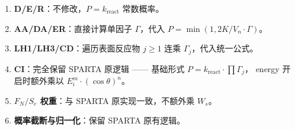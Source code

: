 \documentclass[12pt,a4paper]{article}
\begin{document}
\begin{enumerate}
  \item \textbf{D/E/R}：不修改，$P = k_{\text{react}}$ 常数概率。
  \item \textbf{AA/DA/ER}：直接计算单因子 $\Gamma$，代入 $P = \min(1, 2K/V_n \cdot \Gamma)$。
  \item \textbf{LH1/LH3/CD}：遍历表面反应物 $j \ge 1$ 连乘 $\Gamma_j$，代入统一公式。
  \item \textbf{CI}：完全保留 SPARTA 原逻辑 —— 基础形式 $P = k_{\text{react}} \cdot \prod\Gamma_j$，
        energy 开启时额外乘以 $E_i^m \cdot (\cos\theta)^n$。
  \item \textbf{$F_N/S_e$ 权重}：与 SPARTA 原实现一致，不额外乘 $W_s$。
  \item \textbf{概率截断与归一化}：保留 SPARTA 原有逻辑。
\end{enumerate}
\end{document}
